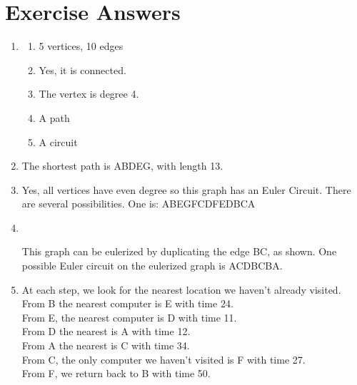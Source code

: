 \section{Exercise Answers}
\begin{enumerate}
\item  \begin{enumerate}
\item 5 vertices, 10 edges
\item Yes, it is connected.
\item The vertex is degree 4.
\item A path
\item  A circuit\\
\end{enumerate}

\item The shortest path is ABDEG, with length 13.\\

\item Yes, all vertices have even degree so this graph has an Euler Circuit.  There are several possibilities.  One is:  ABEGFCDFEDBCA\\


\item \hspace{.2in}\\
\begin{minipage}{0.5\textwidth}
This graph can be eulerized by duplicating the edge BC, as shown.  One possible Euler circuit on the eulerized graph is ACDBCBA.
\end{minipage}
%
\begin{minipage}{0.5\textwidth}
\end{minipage}

\item At each step, we look for the nearest location we haven't already visited.  \\
From B the nearest computer is E with time 24.  \\
From E, the nearest computer is D with time 11.  \\
From D the nearest is A with time 12. \\
From A the nearest is C with time 34.  \\
From C, the only computer we haven't visited is F with time 27.\\
From F, we return back to B with time 50.\\


\end{enumerate}
